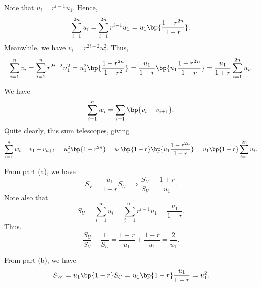\begin{solution}
    \begin{ppart}
        Note that $u_i = r^{i-1} u_1$. Hence, \[\sum_{i = 1}^{2n} u_i = \sum_{i = 1}^{2n} r^{i-1} u_1 = u_1 \bp{\frac{1-r^{2n}}{1-r}}.\] Meanwhile, we have $v_1 = r^{2i-2} u_1^2$. Thus, \[\sum_{i = 1}^n v_i = \sum_{i = 1}^n r^{2i-2} u_1^2 = u_1^2 \bp{\frac{1 - r^{2n}}{1 - r^2}} = \frac{u_1}{1 + r} \bp{u_1 \frac{1 - r^{2n}}{1 - r}} = \frac{u_1}{1 + r} \sum_{i = 1}^{2n} u_i.\]
    \end{ppart}
    \begin{ppart}
        We have \[\sum_{i = 1}^n w_i = \sum_{i = 1} \bp{v_i - v_{i+1}}.\] Quite clearly, this sum telescopes, giving \[\sum_{i = 1}^n w_i = v_1 - v_{n+1} = u_1^2 \bp{1 - r^{2n}} = u_1 \bp{1 - r} \bp{u_1 \frac{1 - r^{2n}}{1 - r}} = u_1 \bp{1-r} \sum_{i = 1}^{2n} u_i.\]
    \end{ppart}
    \begin{ppart}
        From part (a), we have \[S_V = \frac{u_1}{1 + r} S_U \implies \frac{S_U}{S_V} = \frac{1 + r}{u_1}.\] Note also that \[S_U = \sum_{i = 1}^\infty u_i = \sum_{i = 1}^\infty r^{i-1} u_1 = \frac{u_1}{1 - r}.\] Thus, \[\frac{S_U}{S_V} + \frac1{S_U} = \frac{1 + r}{u_1} + \frac{1 - r}{u_1} = \frac{2}{u_1}.\]
    \end{ppart}
    \begin{ppart}
        From part (b), we have \[S_W = u_1 \bp{1 - r} S_U = u_1 \bp{1 - r} \frac{u_1}{1 - r} = u_1^2.\]
    \end{ppart}
\end{solution}


